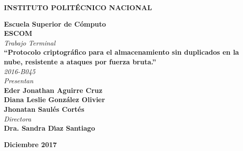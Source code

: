 \documentclass[12pt,oneside,onecolumn]{book}
\begin{document}
\begin{titlepage}
{	    {\fontsize{19}{30} \textbf{  INSTITUTO POLIT\'ECNICO NACIONAL}}
	    \begin{center}
	    {\fontsize{16}{20} \textbf{Escuela Superior de C\'omputo}}\vspace{1cm}\\
	    {\fontsize{18}{20} \textbf{ESCOM}}\vspace{2cm}\\
	    
	    {\fontsize{14}{20} \textit{Trabajo Terminal}}\vspace{1cm}\\
	    {\fontsize{16}{20} \textbf{``Protocolo criptográfico para el almacenamiento sin duplicados en la nube, resistente a ataques por fuerza bruta.''}}\vspace{1cm}\\
	    {\fontsize{14}{20} \textit{2016-B045}}\vspace{1cm}\\
	    {\fontsize{14}{20} \textit{Presentan}}\\
	    {\fontsize{14}{20} \textbf{Eder Jonathan Aguirre Cruz \\ Diana Leslie González Olivier \\ \vspace{.2cm} Jhonatan Saulés Cortés }}\vspace{2.5cm}\\
	    {\fontsize{14}{20} \textit{Directora}}\\
	    {\fontsize{14}{20} \textbf{Dra. Sandra D\'\i az Santiago}}   \vspace{3cm}
	    \end{center}

	       \hfill   \fontsize{14}{20}  \textbf{Diciembre 2017} 
	    
	}
\end{titlepage}
\end{document}
